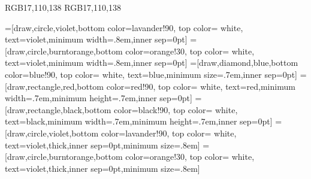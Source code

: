 \usepackage{amsmath}
\usepackage{amsfonts}
\usepackage{amssymb}
\usepackage[english]{babel}
\usepackage{graphicx}
\usepackage{tikz}
\usepackage{pgfplots}
\usepackage{cases}
\usepackage{subfig}
\usepackage{float}
\usepackage{cite}
\usepackage{algorithmic}
\usepackage{filecontents}
\usepackage{pstool}
\usepackage{booktabs}
\usepackage{pdflscape}


\usetikzlibrary{patterns,topaths,positioning,calc,arrows,shapes,backgrounds,shapes.geometric,plotmarks,decorations.pathreplacing,decorations.markings,shapes.misc,shadows}
\usepackage{hf-tikz}
\usetikzlibrary{matrix}
\usetikzlibrary{external} 
\tikzexternalize[prefix=./images/pdf/] 


\pgfplotsset{compat/show suggested version=false}

\newlength\figureheight 
\newlength\figurewidth 


\def\lav{lavander!90}
\def\oran{orange!30}
\def\dgree{dgreen!90}
\definecolor{blue_kuleuven}		{RGB}{17,110,138}	
\definecolor{bk}		{RGB}{17,110,138}	
%


=[draw,circle,violet,bottom color=\lav,
                  top color= white, text=violet,minimum width=.8em,inner sep=0pt]
=[draw,circle,burntorange,bottom color=\oran,
                  top color= white, text=violet,minimum width=.8em,inner sep=0pt]
=[draw,diamond,blue,bottom color=blue!90,
                  top color= white, text=blue,minimum size=.7em,inner sep=0pt]
=[draw,rectangle,red,bottom color=red!90,
                  top color= white, text=red,minimum width=.7em,minimum height=.7em,inner sep=0pt]
=[draw,rectangle,black,bottom color=black!90,
                  top color= white, text=black,minimum width=.7em,minimum height=.7em,inner sep=0pt]
=[draw,circle,violet,bottom color=\lav,
                  top color= white, text=violet,thick,inner sep=0pt,minimum size=.8em]
=[draw,circle,burntorange,bottom color=\oran,
                  top color= white, text=violet,thick,inner sep=0pt,minimum size=.8em]



